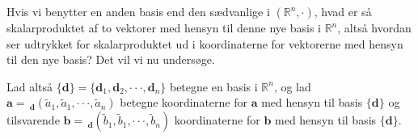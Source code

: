 Hvis vi benytter en anden basis end den sædvanlige i $(\mathbb{R}^{n}, \cdot)$, hvad er så skalarproduktet af to
vektorer med hensyn til denne nye basis i $\mathbb{R}^{n}$, altså hvordan ser udtrykket for skalarproduktet ud i koordinaterne for vektorerne med hensyn til den nye basis? Det vil vi nu undersøge. \bs

Lad altså $\{\mathbf{d}\} = \{\mathbf{d}_{1}, \mathbf{d}_{2}, \cdot \cdot \cdot , \mathbf{d}_{n} \}$ betegne en basis i $\mathbb{R}^{n}$, og lad $\mathbf{a} = \, _{\mathbf{d}}(\widetilde{a}_{1}, \widetilde{a}_{1}, \cdot \cdot \cdot, \widetilde{a}_{n})$ betegne koordinaterne for $\mathbf{a}$ med hensyn til basis $\{\mathbf{d}\}$ og tilsvarende $\mathbf{b} = \, _{\mathbf{d}}(\widetilde{b}_{1}, \widetilde{b}_{1}, \cdot \cdot \cdot, \widetilde{b}_{n})$ koordinaterne for $\mathbf{b}$ med hensyn til basis $\{\mathbf{d}\}$. \bs

